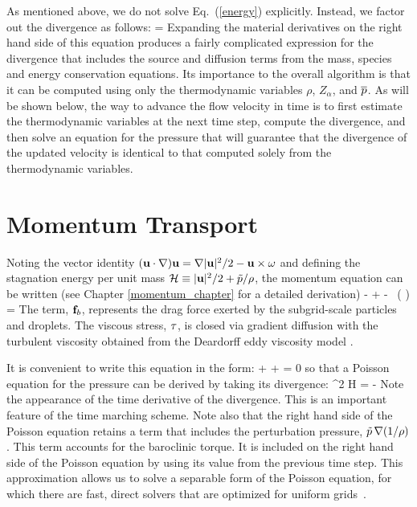 As mentioned above, we do not solve Eq.~(\ref{energy}) explicitly. Instead, we factor out the divergence as follows:
\be
\label{eqn_simplediv1}
\Div{} =  
\ee
Expanding the material derivatives on the right hand side of this equation produces a fairly complicated expression for
the divergence that includes the source and diffusion terms from the mass, species and energy conservation equations.
Its importance to the overall algorithm is that it can be computed using only the
thermodynamic variables $\rho$, $Z_\alpha$, and $\overline{p}$. As will be shown below, the way to advance the flow velocity in time
is to first estimate the thermodynamic variables at the next time step, compute the divergence, and then solve an equation
for the pressure that will guarantee that the divergence of the updated velocity is identical to that computed solely from
the thermodynamic variables.



\section{Momentum Transport}

Noting the vector identity $({\bf u} \cdot \nabla) {\bf u} = \nabla|{\bf u}|^2/2 - {\bf u}\times{\bf \omega} $ and defining the stagnation energy per unit mass ${\cal H} \equiv |{\bf u}|^2/2 + \tilde{p}/\rho$, the momentum equation can be written (see Chapter \ref{momentum_chapter} for a detailed derivation)
\be 
    - \bu\times\bo +  - \tp \, \nabla \left( \right) =    
\ee
The term, ${\bf f}_b$, represents the drag force exerted by the subgrid-scale particles and droplets. The viscous stress, ${\bf \tau}$, is closed via gradient diffusion with the turbulent viscosity obtained from the Deardorff eddy viscosity model \cite{Deardorff:1980,Pope:2000}.

It is convenient to write this equation in the form:
\be {} + \bF + \nabla \cH = 0  \ee
so that a Poisson equation for the pressure can be derived by taking its divergence:
\be \nabla^2 {\cal H} = -    \label{simplephi2} \ee
Note the appearance of the time derivative of the divergence. This is an important feature of the time marching scheme. Note also that the right hand side of the Poisson equation retains a term that includes the perturbation pressure, $\tilde{p} \, \nabla (1/\rho)$. This term accounts for the baroclinic torque. It is included on the right hand side of the Poisson equation by using its value from the previous time step. This approximation allows us to solve a separable form of the Poisson equation, for which there are fast, direct solvers that are optimized for uniform grids~\cite{Sweet:1}.

